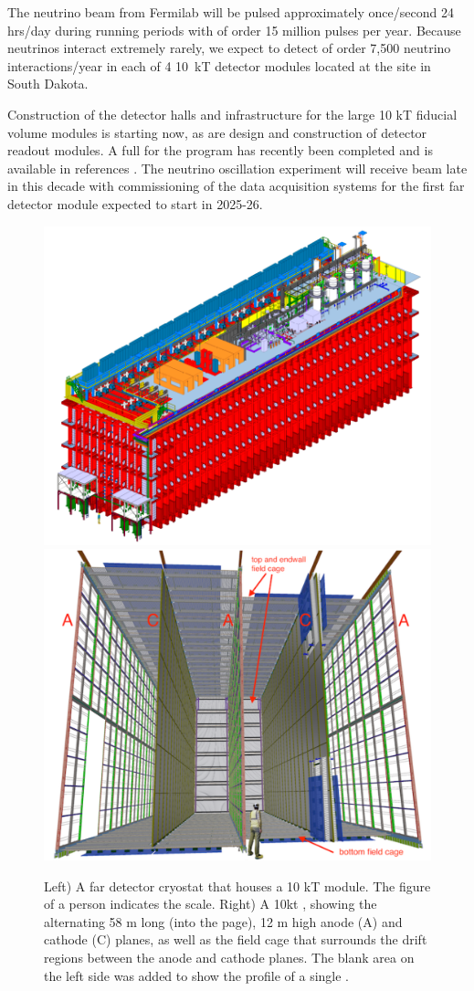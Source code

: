 The neutrino beam from Fermilab will be pulsed approximately once/second 24 hrs/day during running periods with of order 15 million pulses per year.  Because neutrinos interact  extremely rarely, we expect to detect of order 7,500  neutrino interactions/year in each of 4 10~kT detector modules located at the  site in South Dakota. 






Construction of the detector halls and infrastructure for the large 10 kT fiducial volume  modules is starting now, as are design and construction of detector readout modules.  A full  for the program has recently been completed and is available in references \cite{Abi:2020wmh, Abi:2020evt, Abi:2020oxb, Abi:2020loh}.
The   neutrino oscillation experiment will receive beam late in this decade with commissioning of the data acquisition systems for the first far detector module expected to start in 2025-26.  

\begin{figure}
\centering
\includegraphics[height=0.35\textwidth]{graphics/IntroFigures/Fig_03a_cryostat-scale.png}
\includegraphics[height=0.35\textwidth]{graphics/IntroFigures/Fig_03b_DUNESchematic.pdf}
\caption{Left) A far detector cryostat that houses a 10 kT  module. The figure of a person indicates the scale.  Right) A 10kt    , showing the alternating 58 m long (into the page), 12 m high anode (A) and cathode (C) planes, as well as the field cage that surrounds the drift regions between the anode and cathode planes. The blank area on the left side was added to show the profile of a single .}
\label{DUNESchematic}
\end{figure}

